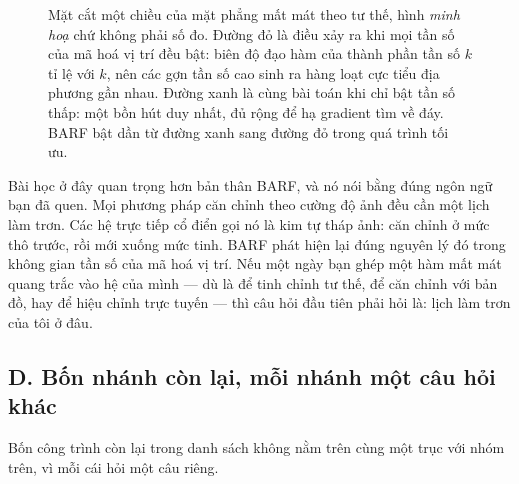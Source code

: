 \documentclass[../../deep_learning.tex]{subfiles}
\begin{document}
\begin{figure}[H]\centering
{}
\caption{Mặt cắt một chiều của mặt phẳng mất mát theo tư thế, hình \emph{minh hoạ} chứ không phải số đo. Đường đỏ là điều xảy ra khi mọi tần số của mã hoá vị trí đều bật: biên độ đạo hàm của thành phần tần số \(k\) tỉ lệ với \(k\), nên các gợn tần số cao sinh ra hàng loạt cực tiểu địa phương gần nhau. Đường xanh là cùng bài toán khi chỉ bật tần số thấp: một bồn hút duy nhất, đủ rộng để hạ gradient tìm về đáy. BARF bật dần từ đường xanh sang đường đỏ trong quá trình tối ưu.}
\label{fig:barf-coarse-fine}
\end{figure}

Bài học ở đây quan trọng hơn bản thân BARF, và nó nói bằng đúng ngôn ngữ bạn đã quen. Mọi phương pháp căn chỉnh theo cường độ ảnh đều cần một lịch làm trơn. Các hệ trực tiếp cổ điển gọi nó là kim tự tháp ảnh: căn chỉnh ở mức thô trước, rồi mới xuống mức tinh. BARF phát hiện lại đúng nguyên lý đó trong không gian tần số của mã hoá vị trí. Nếu một ngày bạn ghép một hàm mất mát quang trắc vào hệ của mình --- dù là để tinh chỉnh tư thế, để căn chỉnh với bản đồ, hay để hiệu chỉnh trực tuyến --- thì câu hỏi đầu tiên phải hỏi là: lịch làm trơn của tôi ở đâu.

\subsection{D. Bốn nhánh còn lại, mỗi nhánh một câu hỏi khác}
Bốn công trình còn lại trong danh sách không nằm trên cùng một trục với nhóm trên, vì mỗi cái hỏi một câu riêng.
\end{document}
